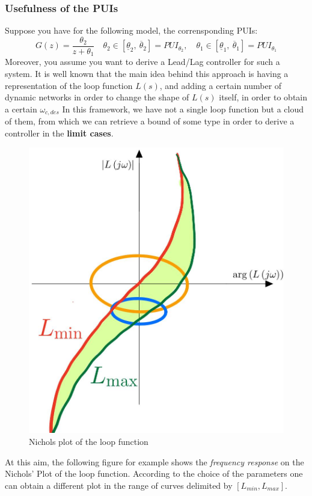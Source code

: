 \subsubsection{\color{orange}Usefulness of the PUIs}
Suppose you have for the following model, the corrensponding PUIs:
\begin{equation*}
    G(z)=\frac{\theta_2}{z+\theta_1} \quad
    \theta_2 \in [\underline{\theta}_2, \ \overline{\theta}_2] = PUI_{\theta_2}, \quad
    \theta_1 \in [\underline{\theta}_1, \ \overline{\theta}_1] = PUI_{\theta_1}
\end{equation*}
Moreover, you assume you want to derive a Lead/Lag controller for such a system. It is well known that the main idea behind this approach is having a representation of the loop function $L(s)$, and adding a certain number of dynamic networks in order to change the shape of $L(s)$ itself, in order to obtain a certain $\omega_{c, des}$ In this framework, we have not a single loop function but a cloud of them, from which we can retrieve a bound of  some type in order to derive a controller in the \textbf{limit cases}.

\begin{figure}[h]
    \centering
    \includegraphics[scale=0.2]{img/Nichols.jpeg}
    \caption{Nichols plot of the loop function}
\end{figure}
At this aim, the following figure for example shows the \textit{frequency response} on the Nichols' Plot of the loop function. According to the choice of the parameters one can obtain a different plot in the range of curves delimited by $[L_{min}, L_{max}]$.

